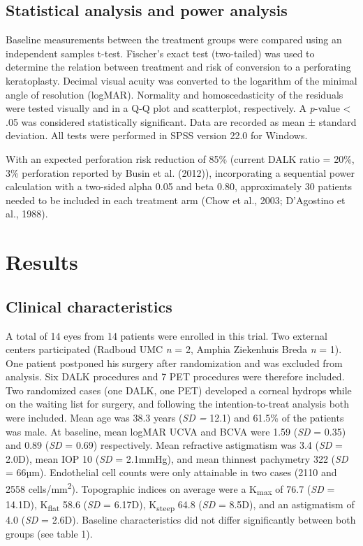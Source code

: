 \documentclass[authordate, empirical,issue]{jote-new-article}
\begin{document}
	\subsection{Statistical analysis and power analysis}



	Baseline measurements between the treatment groups were compared using an independent samples t-test. Fischer's exact test (two-tailed) was used to determine the relation between treatment and risk of conversion to a perforating keratoplasty. Decimal visual acuity was converted to the logarithm of the minimal angle of resolution (logMAR). Normality and homoscedasticity of the residuals were tested visually and in a Q-Q plot and scatterplot, respectively. A \emph{p}-value < .05 was considered statistically significant. Data are recorded as mean ± standard deviation. All tests were performed in SPSS version 22.0 for Windows.



	With an expected perforation risk reduction of 85\% (current DALK ratio = 20\%, 3\% perforation reported by Busin et al. (2012)), incorporating a sequential power calculation with a two-sided alpha 0.05 and beta 0.80, approximately 30 patients needed to be included in each treatment arm\textsuperscript{ }(Chow et al., 2003; D'Agostino et al., 1988).



	\section{Results}

	\subsection{Clinical characteristics}



	A total of 14 eyes from 14 patients were enrolled in this trial. Two external centers participated (Radboud UMC \emph{n }= 2, Amphia Ziekenhuis Breda \emph{n} = 1). One patient postponed his surgery after randomization and was excluded from analysis. Six DALK procedures and 7 PET procedures were therefore included. Two randomized cases (one DALK, one PET) developed a corneal hydrops while on the waiting list for surgery, and following the intention-to-treat analysis both were included. Mean age was 38.3 years (\emph{SD =} 12.1) and 61.5\% of the patients was male. At baseline, mean logMAR UCVA and BCVA were 1.59 (\emph{SD }=\emph{ }0.35) and 0.89 (\emph{SD }=\emph{ }0.69) respectively. Mean refractive astigmatism was 3.4 (\emph{SD }=\emph{ }2.0D), mean IOP 10 (\emph{SD }=\emph{ }2.1mmHg), and mean thinnest pachymetry 322 (\emph{SD }=\emph{ }66µm). Endothelial cell counts were only attainable in two cases (2110 and 2558 cells/mm\textsuperscript{2}). Topographic indices on average were a K\textsubscript{max} of 76.7 (\emph{SD }=\emph{ }14.1D), K\textsubscript{flat} 58.6 (\emph{SD }=\emph{ }6.17D), K\textsubscript{steep} 64.8 (\emph{SD }=\emph{ }8.5D), and an astigmatism of 4.0 (\emph{SD }=\emph{ }2.6D). Baseline characteristics did not differ significantly between both groups (see table 1).
	
\end{document}
